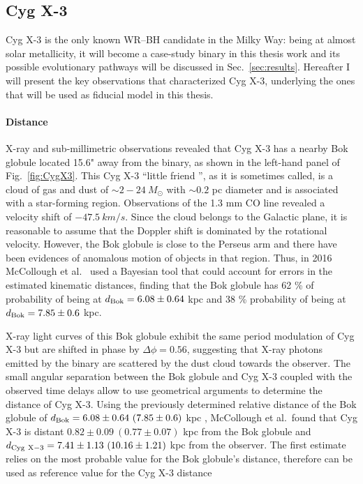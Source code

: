 \documentclass[a4paper,titlepage]{book}     	%
\newcommand{\sun}{\ensuremath{_\odot}}
\newcommand{\msun}{\ensuremath{M\sun}}
\begin{document}
\subsection{Cyg X-3}\label{subsec:cygx3observations}
Cyg X-3 is the only known WR--BH candidate in the Milky Way: being at almost solar metallicity, it will become a case-study binary in this thesis work and its possible evolutionary pathways will be discussed in Sec.\ \ref{sec:results}. Hereafter I will present the key observations that characterized Cyg X-3, underlying the ones that will be used as fiducial model in this thesis.

\paragraph{Distance}
X-ray and sub-millimetric observations revealed that Cyg X-3 has a nearby Bok globule located 15.6" away from the binary, as shown in the left-hand panel of Fig.\ \ref{fig:CygX3}. This Cyg X-3 ``little friend '', as it is sometimes called, is a cloud of gas and dust of $\sim 2-24~\msun$ with $\sim 0.2$ pc diameter and is associated with a star-forming region. Observations of the 1.3 mm CO line revealed a velocity shift of $\SI{-47.5}{km/s}$. Since the cloud belongs to the Galactic plane, it is reasonable to assume that the Doppler shift is dominated by the rotational velocity. However, the Bok globule is close to the Perseus arm and there have been evidences of anomalous motion of objects in that region. Thus, in 2016 McCollough et al.\ \cite{CygX-3_McCollough2016_Observation} used a Bayesian tool that could account for errors in the estimated kinematic distances, finding that the Bok globule has 62 \% of probability of being at $d_{\rm Bok} = 6.08 \pm 0.64$ kpc and 38 \% probability of being at $d_{\rm Bok} = 7.85 \pm 0.6$ kpc.

X-ray light curves of this Bok globule exhibit the same period modulation of Cyg X-3 but are shifted in phase by $\Delta \phi = 0.56$, suggesting that X-ray photons emitted by the binary are scattered by the dust cloud towards the observer. The small angular separation between the Bok globule and Cyg X-3 coupled with the observed time delays allow to use geometrical arguments to determine the distance of Cyg X-3. Using the previously determined relative distance of the Bok globule of $d_{\rm Bok} = 6.08 \pm 0.64~ (7.85 \pm 0.6)$ kpc , McCollough et al.\ found that Cyg X-3 is distant $0.82 \pm 0.09~ (0.77 \pm 0.07)$ kpc from the Bok globule and $d_{\rm Cyg~X-3} = 7.41 \pm 1.13~ (10.16 \pm 1.21)$ kpc from the observer. The first estimate relies on the most probable value for the Bok globule's distance, therefore can be used as reference value for the Cyg X-3 distance
\end{document}
